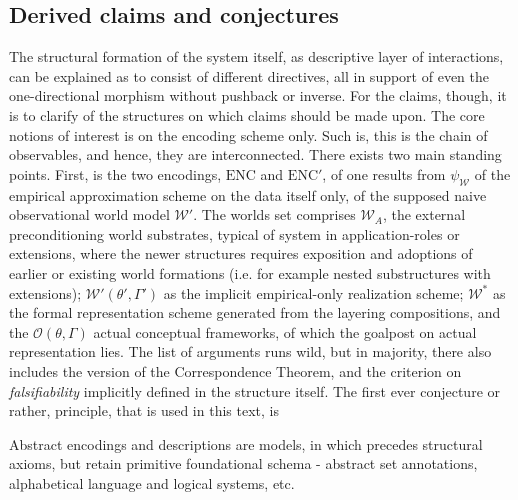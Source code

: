 \subsection{Derived claims and conjectures}

The structural formation of the system itself, as descriptive layer of interactions, can be explained as to consist of different directives, all in support of even the one-directional morphism without pushback or inverse. For the claims, though, it is to clarify of the structures on which claims should be made upon. The core notions of interest is on the encoding scheme only. Such is, this is the chain of observables, and hence, they are interconnected. There exists two main standing points. First, is the two encodings, $\mathrm{ENC}$ and $\mathrm{ENC}'$, of one results from $\psi_{\mathcal{W}}$ of the empirical approximation scheme on the data itself only, of the supposed naive observational world model $\mathcal{W}'$. The worlds set comprises $\mathcal{W}_{A}$, the external preconditioning world substrates, typical of system in application-roles or extensions, where the newer structures requires exposition and adoptions of earlier or existing world formations (i.e. for example nested substructures with extensions); $\mathcal{W}'(\theta',\Gamma')$ as the implicit empirical-only realization scheme; $\mathcal{W}^{*}$ as the formal representation scheme generated from the layering compositions, and the $\mathcal{O}(\theta,\Gamma)$ actual conceptual frameworks, of which the goalpost on actual representation lies. The list of arguments runs wild, but in majority, there also includes the version of the Correspondence Theorem, and the criterion on \textit{falsifiability} implicitly defined in the structure itself. The first ever conjecture or rather, principle, that is used in this text, is 
\begin{principle}
	Abstract encodings and descriptions are models, in which precedes structural axioms, but retain primitive foundational schema - abstract set annotations, alphabetical language and logical systems, etc.
\end{principle}
